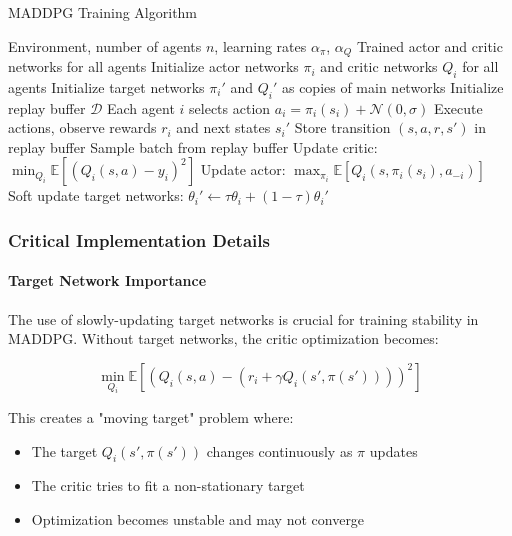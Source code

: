 \documentclass[conference]{IEEEtran}
\begin{document}
{{\begin{algorithm}[h!]
\caption{MADDPG Training Algorithm}
\begin{algorithmic}[1]
\REQUIRE Environment, number of agents $n$, learning rates $\alpha_\pi$, $\alpha_Q$
\ENSURE Trained actor and critic networks for all agents
\STATE Initialize actor networks $\pi_i$ and critic networks $Q_i$ for all agents
\STATE Initialize target networks $\pi_i'$ and $Q_i'$ as copies of main networks
\STATE Initialize replay buffer $\mathcal{D}$
        \STATE Each agent $i$ selects action $a_i = \pi_i(s_i) + \mathcal{N}(0, \sigma)$
        \STATE Execute actions, observe rewards $r_i$ and next states $s_i'$
        \STATE Store transition $(s, a, r, s')$ in replay buffer
            \STATE Sample batch from replay buffer
                \STATE Update critic: $\min_{Q_i} \mathbb{E}[(Q_i(s,a) - y_i)^2]$
                \STATE Update actor: $\max_{\pi_i} \mathbb{E}[Q_i(s, \pi_i(s_i), a_{-i})]$
                \STATE Soft update target networks: $\theta_i' \leftarrow \tau\theta_i + (1-\tau)\theta_i'$
            \ENDFOR
        \ENDIF
    \ENDFOR
\ENDFOR
\end{algorithmic}
\label{alg:maddpg}
\end{algorithm}

\subsubsection{Critical Implementation Details}

\paragraph{Target Network Importance}

The use of slowly-updating target networks is crucial for training stability in MADDPG. Without target networks, the critic optimization becomes:

\begin{equation}
\min_{Q_i} \mathbb{E}[(Q_i(s,a) - (r_i + \gamma Q_i(s', \pi(s'))))^2]
\end{equation}

This creates a "moving target" problem where:
\begin{itemize}
    \item The target $Q_i(s', \pi(s'))$ changes continuously as $\pi$ updates
    \item The critic tries to fit a non-stationary target
    \item Optimization becomes unstable and may not converge
\end{itemize}

}}
\end{document}
